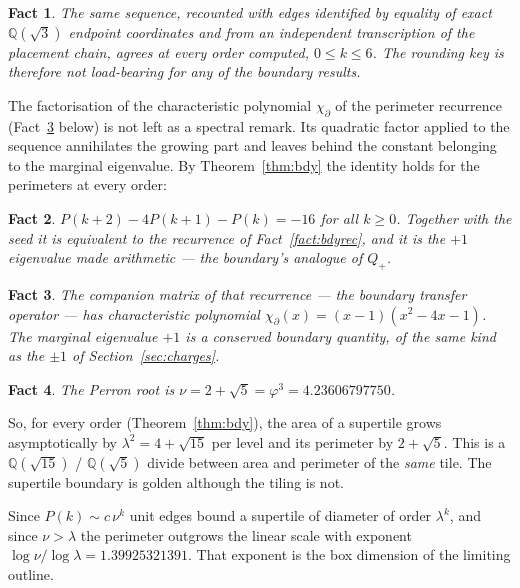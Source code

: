 \documentclass[11pt]{article}
\newtheorem{fact}{Fact}
\theoremstyle{definition}
\theoremstyle{remark}
\newcommand{\lam}{\lambda}
\begin{document}
\begin{fact}
\label{fact:bdyexact}
The same sequence, recounted with edges identified by \emph{equality} of
exact $\mathbb{Q}(\sqrt3)$ endpoint coordinates and from an independent
transcription of the placement chain, agrees at every order computed, $0\le k\le6$.  The
rounding key is therefore not load-bearing for any of the boundary results.
\end{fact}

\noindent
The factorisation of the characteristic polynomial $\chi_{\partial}$ of the perimeter recurrence
(Fact~\ref{fact:bdychi} below) is not left as a spectral remark.  Its
quadratic factor applied to the sequence annihilates the growing part and
leaves behind the constant belonging to the marginal eigenvalue.  By
Theorem~\ref{thm:bdy} the identity holds for the perimeters at every order:

\begin{fact}
\label{fact:bdyinv}
$P(k+2)-4P(k+1)-P(k)=-16$ for all $k\ge0$.  Together with the seed it is
equivalent to the recurrence of Fact~\ref{fact:bdyrec}, and it is the $+1$
eigenvalue made arithmetic --- the boundary's analogue of $Q_{+}$.
\end{fact}

\begin{fact}
\label{fact:bdychi}
The companion matrix of that recurrence --- the boundary transfer operator ---
has characteristic polynomial $\chi_{\partial}(x)=(x - 1)(x^{2} - 4 x - 1)$.  The marginal eigenvalue
$+1$ is a conserved boundary quantity, of the same kind as the $\pm1$ of
Section~\ref{sec:charges}.
\end{fact}

\begin{fact}
\label{fact:nu}
The Perron root is $\nu=2 + \sqrt{5}=\varphi^{3}=4.23606797750$.
\end{fact}

\noindent
So, for every order (Theorem~\ref{thm:bdy}), the area of a supertile grows asymptotically by $\lam^{2}=4+\sqrt{15}$
per level and its perimeter by $2+\sqrt5$.  This is a $\mathbb{Q}(\sqrt{15})$ / $\mathbb{Q}(\sqrt5)$
divide between area and perimeter of the
\emph{same} tile.  The supertile
boundary is golden although the tiling is not.

Since $P(k)\sim c\,\nu^{k}$ unit edges bound a
supertile of diameter of order $\lam^{k}$, and since $\nu>\lam$ the perimeter outgrows the
linear scale with exponent $\log\nu/\log\lam=1.39925321391$.  That exponent is the box dimension of the
limiting outline.
\end{document}
